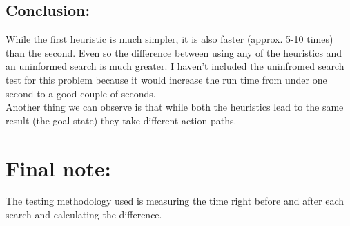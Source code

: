 \documentclass[a4paper, 12pt]{article}
\begin{document}
\subsection*{Conclusion:}
While the first heuristic is much simpler, it is also faster (approx. 5-10 times)
than the second. Even so the difference between using any of the heuristics and an uninformed
search is much greater. I haven't included the uninfromed search test for this problem
because it would increase the run time from under one second to a good couple of seconds.\\
Another thing we can observe is that while both the heuristics lead to the same result
(the goal state) they take different action paths.

\section*{Final note:}
The testing methodology used is measuring the time right before and after each search and
calculating the difference.
\end{document}
